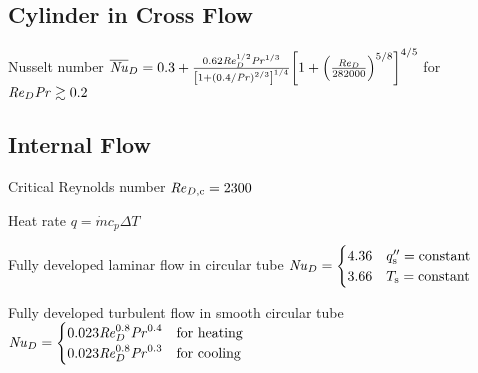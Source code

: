 \documentclass{article}
\begin{document}
\subsection{Cylinder in Cross Flow}
\begin{description*}
\item[Nusselt number]
  \(\overline{\mathord{\mathit{Nu}}}_D
  = 0.3 + \frac{0.62\mathord{\mathit{Re}}_D^{1/2}\mathord{\mathit{Pr}}^{1/3}}
               {{\left[1+{(0.4/\mathord{\mathit{Pr}})}^{2/3}\right]}^{1/4}}
          {\left[1 + {\left(\frac{\mathord{\mathit{Re}}_D}{282000}\right)}^{5/8}\right]}^{4/5}\)
  for \(\mathord{\mathit{Re}}_D\mathord{\mathit{Pr}} \gtrsim 0.2\)
\end{description*}

\subsection{Internal Flow}
\begin{description*}
\item[Critical Reynolds number]
  \(\mathord{\mathit{Re}}_{D,\mathrm{c}} = \num{2300}\)
\item[Heat rate]
  \(q = \dot{m}c_p\Delta{}T\)
\item[Fully developed laminar flow in circular tube]
  \(\mathord{\mathit{Nu}}_D =
  \begin{cases}
    4.36 & q_{\mathrm{s}}'' = \textrm{constant} \\
    3.66 & T_{\mathrm{s}} = \textrm{constant}
  \end{cases}\)
\item[Fully developed turbulent flow in smooth circular tube]
  \(\mathord{\mathit{Nu}}_D =
  \begin{cases}
    0.023\mathord{\mathit{Re}}_D^{0.8}\mathord{\mathit{Pr}}^{0.4} & \textrm{for heating} \\
    0.023\mathord{\mathit{Re}}_D^{0.8}\mathord{\mathit{Pr}}^{0.3} & \textrm{for cooling}
  \end{cases}\)
\end{description*}
\end{document}

